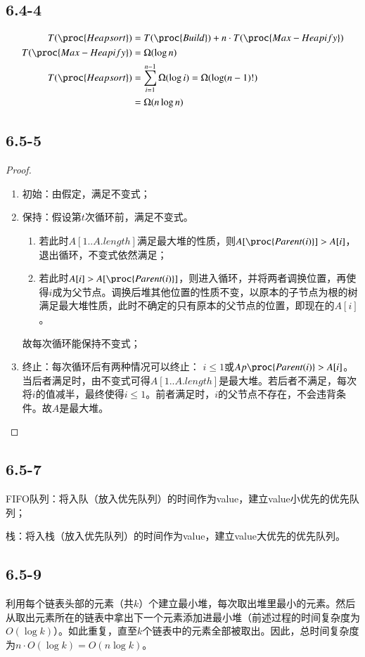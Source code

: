 \documentclass[twocolumn]{article}
\begin{document}
	\subsection*{6.4-4}
	\[
	\begin{aligned}
		T(\proc{Heapsort})&=T(\proc{Build})+n\cdot T(\proc{Max-Heapify})\\
		T(\proc{Max-Heapify})&=\Omega(\log n)\\
		T(\proc{Heapsort})&=\sum_{i=1}^{n-1}\Omega(\log i)=\Omega(\log (n-1)!)\\
		&=\Omega(n\log n)
	\end{aligned}
	\]
	\subsection*{6.5-5}
	\begin{proof}
		\begin{enumerate}[(1)]
			\item 初始：由假定，满足不变式；
			\item 保持：假设第$t$次循环前，满足不变式。
			\begin{enumerate}[1.]
				\item 若此时$A[1..A.length]$满足最大堆的性质，则$A[\proc{Parent(i)}]>A[i]$，退出循环，不变式依然满足；
				\item 
				若此时$A[i]>A[\proc{Parent(i)}]$，则进入循环，并将两者调换位置，再使得$i$成为父节点。调换后堆其他位置的性质不变，以原本的子节点为根的树满足最大堆性质，此时不确定的只有原本的父节点的位置，即现在的$A[i]$。
			\end{enumerate}
		故每次循环能保持不变式；
		\item 终止：每次循环后有两种情况可以终止：
		$i\le 1$或$Ap\proc{Parent(i)}>A[i]$。当后者满足时，由不变式可得$A[1..A.length]$是最大堆。若后者不满足，每次将$i$的值减半，最终使得$i\le 1$。前者满足时，$i$的父节点不存在，不会违背条件。故$A$是最大堆。
		\end{enumerate}
	\end{proof}
	\subsection*{6.5-7}
	FIFO队列：将入队（放入优先队列）的时间作为value，建立value小优先的优先队列；\par 
	栈：将入栈（放入优先队列）的时间作为value，建立value大优先的优先队列。
	\subsection*{6.5-9}
	利用每个链表头部的元素（共$k$）个建立最小堆，每次取出堆里最小的元素。然后从取出元素所在的链表中拿出下一个元素添加进最小堆（前述过程的时间复杂度为$O(\log k)$）。如此重复，直至$k$个链表中的元素全部被取出。因此，总时间复杂度为$n\cdot O(\log k)=O(n\log k)$。
\end{document}
